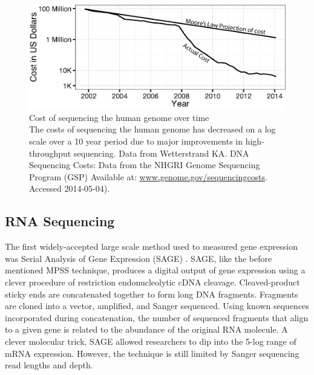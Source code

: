     \begin{figure} %
      \centering 
      \includegraphics{Figures/Intro/Sequencing_costs_over_time.eps}
      \caption[Cost of sequencing the human genome over time]
      {
        Cost of sequencing the human genome over time\\[0.25cm]
        The costs of sequencing the human genome has decreased on a log scale over a 10 year period due to major improvements in high-throughput sequencing. Data from Wetterstrand KA. DNA Sequencing Costs: Data from the NHGRI Genome Sequencing Program (GSP) Available at: \url{www.genome.gov/sequencingcosts}. Accessed 2014-05-04).
        }
      \label{Intro:fig:SeqCosts}
      \end{figure}

  \subsection{RNA Sequencing}
    \label{Intro:subsec:Types of HTS}

    The first widely-accepted large scale method used to measured gene expression was Serial Analysis of Gene Expression (SAGE) \citep{Velculescu1995a}. SAGE, like the before mentioned MPSS technique, produces a digital output of gene expression using a clever procedure of restriction endonucleolytic cDNA cleavage. Cleaved-product sticky ends are concatenated together to form long DNA fragments. 
    Fragments are cloned into a vector, amplified, and Sanger sequenced. Using known sequences incorporated during concatenation, the number of sequenced fragments that align to a given gene is related to the abundance of the original RNA molecule. A clever molecular trick, SAGE allowed researchers to dip into the 5-log range of mRNA expression. However, the technique is still limited by Sanger sequencing read lengths and depth.

